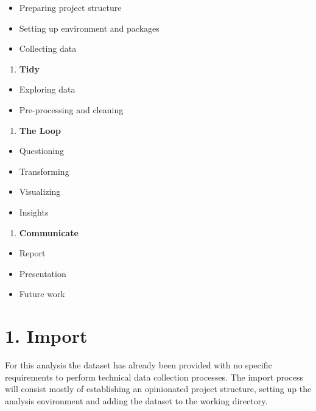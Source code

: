 \documentclass[
]{article}
\providecommand{\tightlist}{%
  \setlength{\itemsep}{0pt}\setlength{\parskip}{0pt}}
\begin{document}
\begin{itemize}
\tightlist
\item
  Preparing project structure
\item
  Setting up environment and packages
\item
  Collecting data
\end{itemize}

\begin{enumerate}
\def\labelenumi{\arabic{enumi}.}
\setcounter{enumi}{1}
\tightlist
\item
  \textbf{Tidy}
\end{enumerate}

\begin{itemize}
\tightlist
\item
  Exploring data
\item
  Pre-processing and cleaning
\end{itemize}

\begin{enumerate}
\def\labelenumi{\arabic{enumi}.}
\setcounter{enumi}{2}
\tightlist
\item
  \textbf{The Loop}
\end{enumerate}

\begin{itemize}
\tightlist
\item
  Questioning
\item
  Transforming
\item
  Visualizing
\item
  Insights
\end{itemize}

\begin{enumerate}
\def\labelenumi{\arabic{enumi}.}
\setcounter{enumi}{3}
\tightlist
\item
  \textbf{Communicate}
\end{enumerate}

\begin{itemize}
\tightlist
\item
  Report
\item
  Presentation
\item
  Future work
\end{itemize}

\newpage

\hypertarget{import}{%
\section{1. Import}\label{import}}

For this analysis the dataset has already been provided with no specific
requirements to perform technical data collection processes. The import
process will consist mostly of establishing an opinionated project
structure, setting up the analysis environment and adding the dataset to
the working directory.
\end{document}
